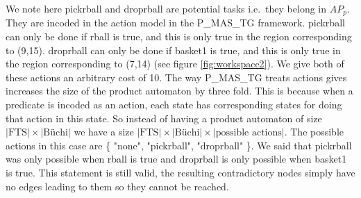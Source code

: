 We note here pickrball and droprball are potential tasks i.e.\ they belong in $AP_p$. They are incoded in the action model in the P\_MAS\_TG framework. pickrball can only be done if rball is true, and this is only true in the region corresponding to (9,15).  droprball can only be done if basket1 is true, and this is only true in the region corresponding to (7,14) (see figure \ref{fig:workspace2}). We give both of these actions an arbitrary cost of 10. The way P\_MAS\_TG treats actions gives increases the size of the product automaton by three fold. This is because when a predicate is incoded as an action, each state has corresponding states for doing that action in this state. So instead of having a product automaton of size $|\text{FTS}| \times |\text{B\"uchi}| $ we have a size $|\text{FTS}| \times |\text{B\"uchi}| \times |\text{possible actions}|$. The possible actions in this case are \{ "none", "pickrball", "droprball" \}. We said that pickrball was only possible when rball is true and droprball is only possible when basket1 is true. This statement is still valid, the resulting contradictory nodes simply have no edges leading to them so they cannot be reached. 
